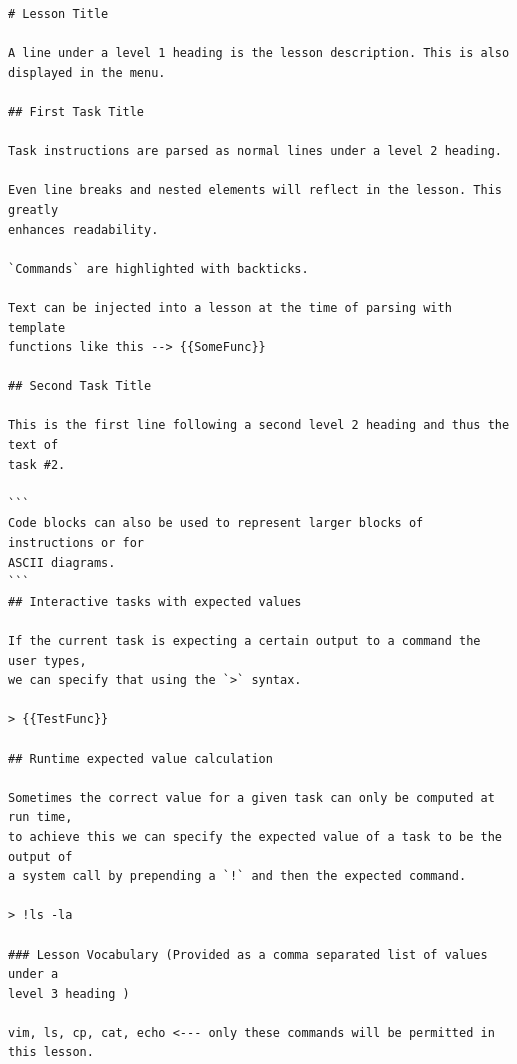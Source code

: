 \begin{lstlisting}[float=htbp, frame=single, language={}, label=lst:markdown, caption=Specification for Markdown lesson files.]
# Lesson Title

A line under a level 1 heading is the lesson description. This is also
displayed in the menu.

## First Task Title

Task instructions are parsed as normal lines under a level 2 heading.

Even line breaks and nested elements will reflect in the lesson. This greatly
enhances readability.

`Commands` are highlighted with backticks.

Text can be injected into a lesson at the time of parsing with template
functions like this --> {{SomeFunc}}

## Second Task Title

This is the first line following a second level 2 heading and thus the text of
task #2.

```
Code blocks can also be used to represent larger blocks of instructions or for
ASCII diagrams.
```
## Interactive tasks with expected values

If the current task is expecting a certain output to a command the user types,
we can specify that using the `>` syntax.

> {{TestFunc}}

## Runtime expected value calculation

Sometimes the correct value for a given task can only be computed at run time,
to achieve this we can specify the expected value of a task to be the output of
a system call by prepending a `!` and then the expected command.

> !ls -la

### Lesson Vocabulary (Provided as a comma separated list of values under a
level 3 heading )

vim, ls, cp, cat, echo <--- only these commands will be permitted in this lesson.

\end{lstlisting}

